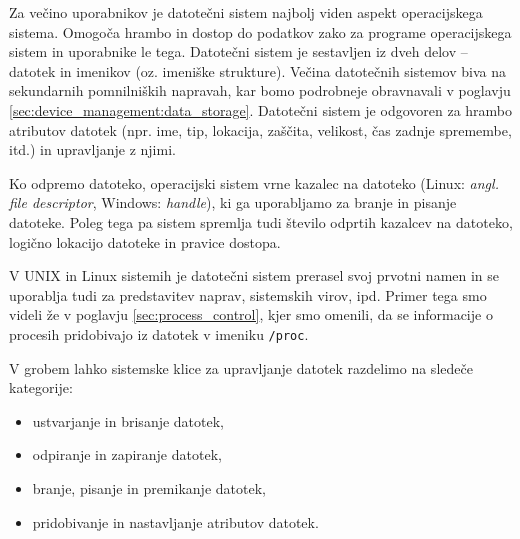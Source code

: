 \documentclass[a4paper,12pt,openright]{book}
\begin{document}
Za večino uporabnikov je datotečni sistem najbolj viden aspekt operacijskega sistema.
Omogoča hrambo in dostop do podatkov zako za programe operacijskega sistem in uporabnike le tega.
Datotečni sistem je sestavljen iz dveh delov -- datotek in imenikov (oz. imeniške strukture).
Večina datotečnih sistemov biva na sekundarnih pomnilniških napravah, kar bomo podrobneje obravnavali v poglavju \ref{sec:device_management:data_storage}.
Datotečni sistem je odgovoren za hrambo atributov datotek (npr. ime, tip, lokacija, zaščita, velikost, čas zadnje spremembe, itd.) in upravljanje z njimi.

Ko odpremo datoteko, operacijski sistem vrne kazalec na datoteko (Linux: \textit{angl. file descriptor}, Windows: \textit{handle}), ki ga uporabljamo za branje in pisanje datoteke.
Poleg tega pa sistem spremlja tudi število odprtih kazalcev na datoteko, logično lokacijo datoteke in pravice dostopa.
\cite{Silberschatz_Galvin_Gagne_2018}

V UNIX in Linux sistemih je datotečni sistem prerasel svoj prvotni namen in se uporablja tudi za predstavitev naprav, sistemskih virov, ipd.
Primer tega smo videli že v poglavju \ref{sec:process_control}, kjer smo omenili, da se informacije o procesih pridobivajo iz datotek v imeniku \verb|/proc|.

V grobem lahko sistemske klice za upravljanje datotek razdelimo na sledeče kategorije:
\begin{itemize}
	\item ustvarjanje in brisanje datotek,
	\item odpiranje in zapiranje datotek,
	\item branje, pisanje in premikanje datotek,
	\item pridobivanje in nastavljanje atributov datotek. \cite{Silberschatz_Galvin_Gagne_2018}
\end{itemize}
\end{document}
